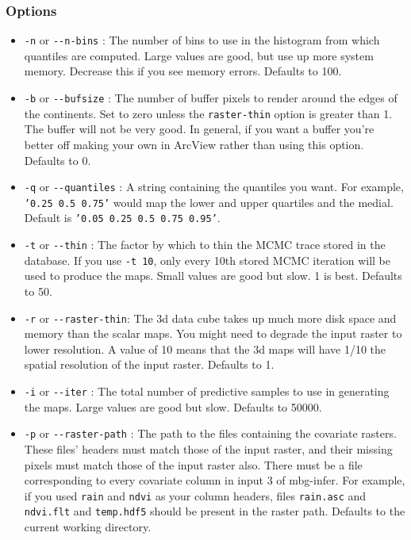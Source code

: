 \subsubsection{Options%
}
%
\begin{itemize}

\item \texttt{-n} or \texttt{-{}-n-bins} : The number of bins to use in the histogram from which quantiles
are computed. Large values are good, but use up more system memory. Decrease this if you
see memory errors. Defaults to 100.

\item \texttt{-b} or \texttt{-{}-bufsize} : The number of buffer pixels to render around the edges of the
continents. Set to zero unless the \texttt{raster-thin} option is greater than 1. The buffer
will not be very good. In general, if you want a buffer you're better off making your
own in ArcView rather than using this option. Defaults to 0.

\item \texttt{-q} or \texttt{-{}-quantiles} : A string containing the quantiles you want. For example,
\texttt{'0.25 0.5 0.75'} would map the lower and upper quartiles and the medial. Default is
\texttt{'0.05 0.25 0.5 0.75 0.95'}.

\item \texttt{-t} or \texttt{-{}-thin} : The factor by which to thin the MCMC trace stored in the database.
If you use \texttt{-t 10}, only every 10th stored MCMC iteration will be used to produce the maps.
Small values are good but slow. 1 is best. Defaults to 50.

\item \texttt{-r} or \texttt{-{}-raster-thin}: The 3d data cube takes up much more disk space and memory than
the scalar maps. You might need to degrade the input raster to lower resolution. A value of
10 means that the 3d maps will have 1/10 the spatial resolution of the input raster. Defaults
to 1.

\item \texttt{-i} or \texttt{-{}-iter} : The total number of predictive samples to use in generating the maps.
Large values are good but slow. Defaults to 50000.

\item \texttt{-p} or \texttt{-{}-raster-path} : The path to the files containing the covariate rasters. These
files' headers must match those of the input raster, and their missing pixels must match
those of the input raster also. There must be a file corresponding to every covariate column
in input 3 of mbg-infer. For example, if you used \texttt{rain} and \texttt{ndvi} as your column headers,
files \texttt{rain.asc} and \texttt{ndvi.flt} and \texttt{temp.hdf5} should be present in the raster path.
Defaults to the current working directory.


\end{itemize}
